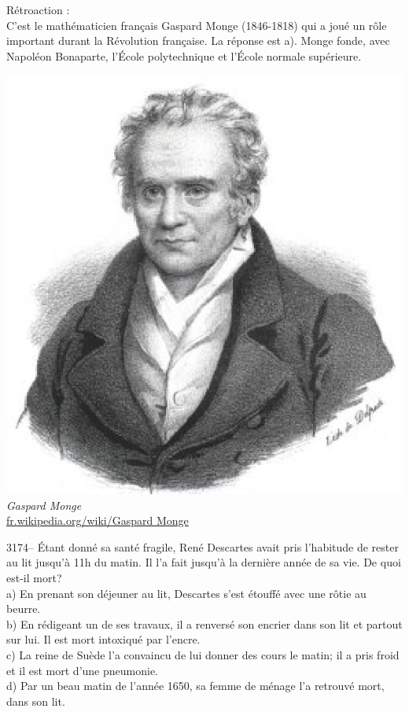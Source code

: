 \documentclass[letterpaper, 12pt]{article}
\begin{document}
R\'etroaction :\\
C'est le math\'ematicien fran\c cais Gaspard Monge (1846-1818) qui a jou\'e un r\^ole important durant la R\'evolution fran\c caise. La r\'eponse est a). Monge fonde, avec Napol\'eon Bonaparte, l'\'Ecole polytechnique et l'\'Ecole normale sup\'erieure.
\begin{center}
\includegraphics[scale=0.45]{Monge.eps}\\
\emph{{\small Gaspard Monge}}\\
\href{http://fr.wikipedia.org/wiki/Gaspard_Monge}{fr.wikipedia.org/wiki/Gaspard Monge}\\[5mm]
\end{center}




3174-- \'Etant donn\'e sa sant\'e fragile, Ren\'e Descartes avait pris l'habitude de rester au lit jusqu'\`a 11h du matin. Il l'a fait jusqu'\`a la derni\`ere ann\'ee de sa vie. De quoi est-il mort?\\

a) En prenant son d\'ejeuner au lit, Descartes s'est \'etouff\'e avec une r\^otie au beurre.\\
b) En r\'edigeant un de ses travaux, il a renvers\'e son encrier dans son lit et partout sur lui. Il est mort intoxiqu\'e par l'encre.\\
c) La reine de Su\`ede l'a convaincu de lui donner des cours le matin; il a pris froid et il est mort d'une pneumonie.\\
d) Par un beau matin de l'ann\'ee 1650, sa femme de m\'enage l'a retrouv\'e mort, dans son lit.\\
\end{document}
